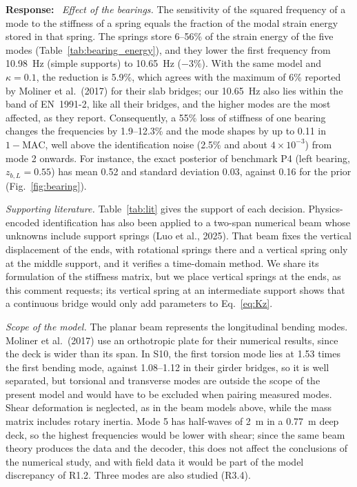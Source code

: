 \documentclass[11pt]{article}
\newenvironment{response}{\par\smallskip\noindent\color{resp}\textbf{Response:}\ }{\par}
\begin{document}
\begin{response}
\textit{Effect of the bearings.} The sensitivity of the squared frequency of a mode to the stiffness of a spring equals
the fraction of the modal strain energy stored in that spring. The springs store 6--56\% of the strain energy of the five modes
(Table~\ref{tab:bearing_energy}), and they lower the first frequency from 10.98~Hz (simple supports) to 10.65~Hz ($-3\%$).
With the same model and $\kappa=0.1$, the reduction is 5.9\%, which agrees with the maximum of 6\% reported by Moliner et al.\ (2017)
for their slab bridges; our 10.65~Hz also lies within the band of EN~1991-2, like all their bridges, and the higher modes are the
most affected, as they report. Consequently, a 55\% loss of stiffness of one bearing changes the frequencies by 1.9--12.3\% and the
mode shapes by up to 0.11 in $1-\mathrm{MAC}$, well above the identification noise (2.5\% and about $4\times10^{-3}$) from mode 2
onwards. For instance, the exact posterior of benchmark P4 (left bearing, $z_{b,L}=0.55$) has mean 0.52 and standard deviation
0.03, against 0.16 for the prior (Fig.~\ref{fig:bearing}).

\textit{Supporting literature.} Table~\ref{tab:lit} gives the support of each decision. Physics-encoded identification has also been
applied to a two-span numerical beam whose unknowns include support springs (Luo et al., 2025). That beam fixes the vertical
displacement of the ends, with rotational springs there and a vertical spring only at the middle support, and it verifies a
time-domain method. We share its formulation of the stiffness matrix, but we place vertical springs at the ends, as this comment
requests; its vertical spring at an intermediate support shows that a continuous bridge would only add parameters to Eq.~\eqref{eq:Kz}.

\textit{Scope of the model.} The planar beam represents the longitudinal bending modes. Moliner et al.\ (2017) use an orthotropic plate for
their numerical results, since the deck is wider than its span. In S10, the first torsion mode lies at 1.53 times the first bending mode, against
1.08--1.12 in their girder bridges, so it is well separated, but torsional and transverse modes are outside the scope of the present
model and would have to be excluded when pairing measured modes. Shear deformation is neglected, as in the beam models above, while the mass
matrix includes rotary inertia. Mode 5 has half-waves of 2~m in a 0.77~m deep deck, so the highest frequencies would be lower with shear;
since the same beam theory produces the data and the decoder, this does not affect the conclusions of the numerical study, and with field data
it would be part of the model discrepancy of R1.2. Three modes are also studied (R3.4).


\end{response}
\end{document}

